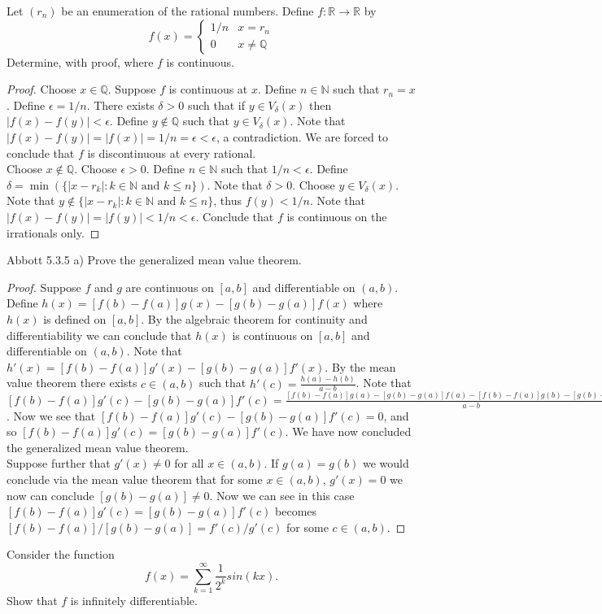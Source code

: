 \documentclass[12pt]{article}
\makeatletter
\theoremstyle{homework}
\newenvironment{exercise}[1]
{\def\@currentlabel{#1}\exercisecore}
{\endexercisecore}
\newcommand{\Reals}{\ensuremath{\mathbb R}}
\let\RR\Reals
\makeatother
\begin{document}
\begin{exercise}
7
Let $(r_n)$ be an enumeration of the rational numbers. Define $f:\RR \to \RR$ by $$f(x) =
\begin{cases}
1/n & x=r_n \\
0 & x\neq\mathbb{Q}
\end{cases}$$
Determine, with proof, where $f$ is continuous.
\end{exercise}
\begin{proof}
Choose $x\in\mathbb{Q}$.  Suppose $f$ is continuous at $x$.  Define $n\in\mathbb{N}$ such that $r_n=x$.  Define $\epsilon=1/n$.  There exists $\delta>0$ such that if $y\in V_\delta(x)$ then $|f(x)-f(y)|<\epsilon$.  Define $y\not\in\mathbb{Q}$ such that $y\in V_\delta(x)$.  Note that $|f(x)-f(y)|=|f(x)|=1/n=\epsilon<\epsilon$, a contradiction.  We are forced to conclude that $f$ is discontinuous at every rational.\\
Choose $x\not\in\mathbb{Q}$.  Choose $\epsilon>0$.  Define $n\in\mathbb{N}$ such that $1/n<\epsilon$.  Define $\delta=\min(\{|x-r_k|:k\in\mathbb{N}\text{ and } k\leq n\})$.  Note that $\delta>0$.  Choose $y\in V_\delta(x)$.  Note that $y\not\in \{|x-r_k|:k\in\mathbb{N}\text{ and } k\leq n\}$, thus $f(y)<1/n$.  Note that $|f(x)-f(y)|=|f(y)|<1/n<\epsilon$.  Conclude that $f$ is continuous on the irrationals only.
\end{proof}
\begin{exercise}
8
Abbott 5.3.5 a)
\end{exercise}
Prove the generalized mean value theorem.
\begin{proof}
Suppose $f$ and $g$ are continuous on $[a,b]$ and differentiable on $(a,b)$.  Define $h(x)=[f(b)-f(a)]g(x)-[g(b)-g(a)]f(x)$ where $h(x)$ is defined on $[a,b]$.  By the algebraic theorem for continuity and differentiability we can conclude that $h(x)$ is continuous on $[a,b]$ and differentiable on $(a,b)$.  Note that $h'(x)=[f(b)-f(a)]g'(x)-[g(b)-g(a)]f'(x)$.  By the mean value theorem there exists $c\in(a,b)$ such that $h'(c)=\frac{h(a)-h(b)}{a-b}$.  Note that $[f(b)-f(a)]g'(c)-[g(b)-g(a)]f'(c)=\frac{[f(b)-f(a)]g(a)-[g(b)-g(a)]f(a)-[f(b)-f(a)]g(b)-[g(b)-g(a)]f(b)}{a-b}=\frac{f(b)g(a)-f(a)g(a)-f(a)g(b)+f(a)g(a)-f(b)g(b)+f(a)g(b)+f(b)g(b)-f(b)g(a)}{a-b}=\frac{0}{a-b}=0$.  Now we see that $[f(b)-f(a)]g'(c)-[g(b)-g(a)]f'(c)=0$, and so $[f(b)-f(a)]g'(c)=[g(b)-g(a)]f'(c)$.  We have now concluded the generalized mean value theorem.\\
Suppose further that $g'(x)\neq 0$ for all $x\in(a,b)$.  If $g(a)=g(b)$ we would conclude via the mean value theorem that for some $x\in(a,b)$, $g'(x)=0$ we now can conclude $[g(b)-g(a)]\neq 0$.  Now we can see in this case $[f(b)-f(a)]g'(c)=[g(b)-g(a)]f'(c)$ becomes $[f(b)-f(a)]/[g(b)-g(a)]=f'(c)/g'(c)$ for some $c\in(a,b)$.
\end{proof}
\begin{exercise}
9
Consider the function $$f(x) = \sum_{k=1}^\infty \frac{1}{2^k} sin(kx).$$ Show that $f$ is infinitely differentiable.
\end{exercise}
\end{document}
